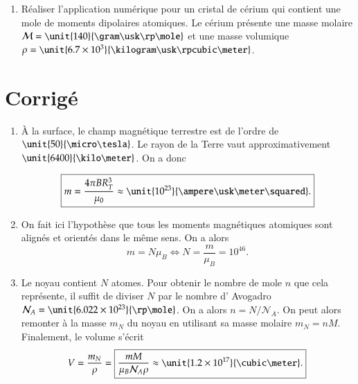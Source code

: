 \begin{exocor}
\begin{enumerate}
	  \item Réaliser l'application numérique pour un cristal de cérium qui contient
	    une mole de moments dipolaires atomiques. Le cérium présente une masse molaire
	    $\mathcal{M} = \unit{140}{\gram \usk \rp \mole}$ et une masse volumique
    $\rho = \unit{6.7 \times 10^3}{\kilogram \usk \rpcubic \meter}$.
	\end{enumerate}
\end{exocor}
\newpage
\section{Corrigé}
\begin{corrige}
\begin{enumerate}
	\item À la surface, le champ magnétique terrestre est de l'ordre de
	  $\unit{50}{\micro \tesla}$. Le rayon de la Terre vaut approximativement
	  $\unit{6400}{\kilo \meter}$. On a donc
	  
	  \begin{equation*}
		  \boxed{ m = \dfrac{4 \pi B R_T^3}{\mu_0} \approx \unit{10^{23}}{\ampere
		  \usk \meter \squared}.} 
	  \end{equation*}

	 \item On fait ici l'hypothèse que tous les moments magnétiques atomiques
	   sont alignés et orientés dans le même sens. On a alors
	   \begin{equation*}
		   m = N\mu_B \iff \boxed{N = \dfrac{m}{\mu_B} = 10^{46}.}
	   \end{equation*}

	 \item Le noyau contient $N$ atomes. Pour obtenir le nombre de mole 
	   $n$ que cela représente, il suffit de diviser $N$ par le nombre d'
	   Avogadro $\mathcal{N}_A = \unit{6.022 \times 10^{23}}{\rp \mole}$.
	   On a alors $n = N/\mathcal{N}_A$. On peut alors remonter à la masse 
	   $m_N$ du noyau en utilisant sa masse molaire $m_N = nM$. Finalement,
	   le volume s'écrit
	   \begin{equation*}
		   V = \dfrac{m_N}{\rho} = \boxed{\dfrac{mM}{\mu_B \mathcal{N}_A \rho}
	   \approx \unit{1.2 \times 10^{17}}{\cubic \meter}.}
	   \end{equation*}


\end{enumerate}
\end{corrige}
